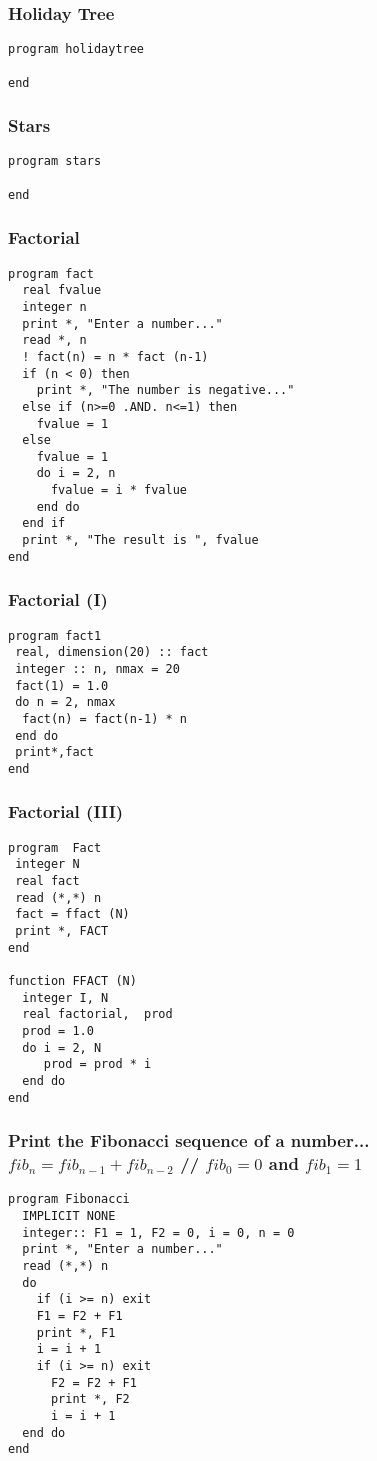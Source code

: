 \documentclass[xcolor=dvipsnames,dvip,notes=show,table]{beamer}
\begin{document}
\begin{frame}[fragile]
\frametitle{Holiday Tree}
\scriptsize
\begin{lstlisting}
program holidaytree
  
end
\end{lstlisting}
\end{frame}


\begin{frame}[fragile]
\frametitle{Stars}
\scriptsize
\begin{lstlisting}
program stars
  
end
\end{lstlisting}
\end{frame}

\begin{frame}[fragile]
\frametitle{Factorial}
\scriptsize
\begin{lstlisting}
program fact
  real fvalue
  integer n
  print *, "Enter a number..."
  read *, n
  ! fact(n) = n * fact (n-1)
  if (n < 0) then 
    print *, "The number is negative..."
  else if (n>=0 .AND. n<=1) then
    fvalue = 1
  else
    fvalue = 1
    do i = 2, n
      fvalue = i * fvalue
    end do
  end if
  print *, "The result is ", fvalue
end
\end{lstlisting}
\end{frame}


\begin{frame}[fragile]
\frametitle{Factorial (I)}

\scriptsize
\begin{lstlisting}
program fact1
 real, dimension(20) :: fact
 integer :: n, nmax = 20
 fact(1) = 1.0
 do n = 2, nmax
  fact(n) = fact(n-1) * n
 end do
 print*,fact
end
\end{lstlisting}
\end{frame}



\begin{frame}[fragile]
\frametitle{Factorial (III)}

\scriptsize
\begin{lstlisting}
program  Fact 
 integer N 
 real fact
 read (*,*) n 
 fact = ffact (N) 
 print *, FACT 
end

function FFACT (N) 
  integer I, N 
  real factorial,  prod
  prod = 1.0 
  do i = 2, N 
     prod = prod * i 
  end do 
end
\end{lstlisting}
\end{frame}


\begin{frame}[fragile]
\frametitle{Print the Fibonacci sequence of a number... $fib_n=fib_{n-1}+fib_{n-2}$ // $fib_0 = 0$ and $fib_1 = 1$}

\scriptsize
\begin{lstlisting}
program Fibonacci
  IMPLICIT NONE
  integer:: F1 = 1, F2 = 0, i = 0, n = 0
  print *, "Enter a number..."
  read (*,*) n
  do 
    if (i >= n) exit
    F1 = F2 + F1
    print *, F1
    i = i + 1
    if (i >= n) exit
      F2 = F2 + F1
      print *, F2
      i = i + 1
  end do
end
\end{lstlisting}
\end{frame}


\frame{
\titlepage

}


\end{document}

